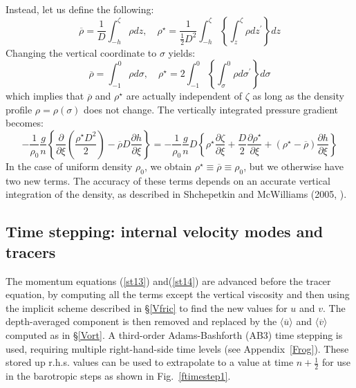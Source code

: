 Instead, let us define the following:
\begin{equation}
  \overline{\rho} = \frac{1}{D} \int_{-h}^\zeta \rho dz , \quad
  \rho^\star = \frac{1}{\frac{1}{2} D^2} \int_{-h}^\zeta
  \left\{ \int_z^\zeta \rho dz^{\prime} \right\} dz
\end{equation}
Changing the vertical coordinate to $\sigma$ yields:
\begin{equation}
  \overline{\rho} =  \int_{-1}^0 \rho d\sigma , \quad
  \rho^\star = 2 \int_{-1}^0
  \left\{ \int_\sigma^0 \rho d\sigma^{\prime} \right\} d\sigma
\end{equation}
which implies that $\overline{\rho}$ and $\rho^\star$ are actually
independent of $\zeta$ as long as the density profile $\rho =
\rho(\sigma)$ does not change. The vertically integrated pressure
gradient becomes:
\begin{equation}
   -\frac{1}{\rho_0} \frac{g}{n} \left\{ \frac{\partial}{\partial \xi}
   \left( \frac{\rho^\star D^2}{2} \right) - \overline{\rho} D
   \frac{\partial h}{\partial \xi} \right\} = -\frac{1}{\rho_0}
   \frac{g}{n} D \left\{ \rho^\star \frac{\partial \zeta}{\partial \xi} +
   \frac{D}{2} \frac{\partial \rho^\star}{\partial \xi} + (\rho^\star -
   \overline{\rho}) \frac{\partial h}{\partial \xi} \right\}
\end{equation}
In the case of uniform density $\rho_0$, we obtain $\rho^\star \equiv
\overline{\rho} \equiv \rho_0$, but we otherwise have two new terms.
The accuracy of these terms depends on an accurate vertical
integration of the density, as described in Shchepetkin and
McWilliams (2005, \cite{SS2005}).

\subsection{Time stepping: internal velocity modes and tracers}
The momentum equations (\ref{st13}) and(\ref{st14}) are advanced before
the tracer equation, by computing all the terms except the vertical
viscosity and then using the implicit scheme described in \S\ref{Vfric}
to find the new values for $u$ and $v$. The depth-averaged component
is then removed and replaced by the $\langle \overline{u} \rangle$
and $\langle \overline{v} \rangle$ computed as in \S\ref{Vort}.
A third-order Adams-Bashforth (AB3) time stepping is used, requiring
multiple right-hand-side time levels (see Appendix~\ref{Frog}). These
stored up r.h.s. values can be used to extrapolate to a value at
time $n+\frac{1}{2}$ for use in the barotropic steps as shown in
Fig.~\ref{ftimestep1}.

